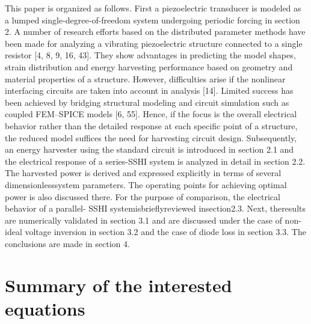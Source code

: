 \documentclass{article}
\begin{document}
This paper is organized as follows. First a piezoelectric
transducer is modeled as a lumped single-degree-of-freedom
system undergoing periodic forcing in section 2. A number
of research efforts based on the distributed parameter methods
have been made for analyzing a vibrating piezoelectric
structure connected to a single resistor [4, 8, 9, 16, 43].
They show advantages in predicting the model shapes, strain
distribution and energy harvesting performance based on
geometry and material properties of a structure. However,
difficulties arise if the nonlinear interfacing circuits are
taken into account in analysis [14]. Limited success has
been achieved by bridging structural modeling and circuit
simulation such as coupled FEM–SPICE models [6, 55].
Hence, if the focus is the overall electrical behavior rather than
the detailed response at each specific point of a structure, the
reduced model suffices the need for harvesting circuit design.
Subsequently, an energy harvester using the standard circuit
is introduced in section 2.1 and the electrical response of a
series-SSHI system is analyzed in detail in section 2.2. The
harvested power is derived and expressed explicitly in terms of
several dimensionlesssystem parameters. The operating points
for achieving optimal power is also discussed there. For the
purpose of comparison, the electrical behavior of a parallel-
SSHI systemisbrieflyreviewed insection2.3. Next, theresults
are numerically validated in section 3.1 and are discussed
under the case of non-ideal voltage inversion in section 3.2 and
the case of diode loss in section 3.3. The conclusions are made
in section 4.



















\section{Summary of the interested equations}
\end{document}
